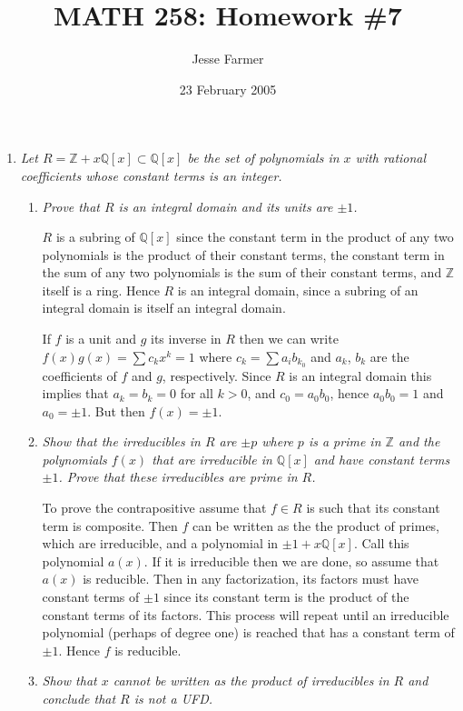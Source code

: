 \documentclass[10pt]{article}
\title{MATH 258: Homework \#7}
\author{Jesse Farmer}
\date{23 February 2005}
\newcommand{\Z}{\mathbb{Z}}
\newcommand{\Q}{\mathbb{Q}}
\begin{document}
\maketitle
\begin{enumerate}

\item \emph{Let $R = \Z + x\Q[x] \subset \Q[x]$ be the set of polynomials in $x$ with rational coefficients whose constant terms is an integer.}
\begin{enumerate}
\item \emph{Prove that $R$ is an integral domain and its units are $\pm 1$.}

$R$ is a subring of $\Q[x]$ since the constant term in the product of any two polynomials is the product of their constant terms, the constant term in the sum of any two polynomials is the sum of their constant terms, and $\Z$ itself is a ring.  Hence $R$ is an integral domain, since a subring of an integral domain is itself an integral domain.

If $f$ is a unit and $g$ its inverse in $R$ then we can write $f(x)g(x) = \sum c_kx^k = 1$ where $c_k = \sum a_ib_{k_0}$ and $a_k$, $b_k$ are the coefficients of $f$ and $g$, respectively.  Since $R$ is an integral domain this implies that $a_k = b_k = 0$ for all $k > 0$, and $c_0 = a_0b_0$, hence $a_0b_0 = 1$ and $a_0 = \pm 1$.  But then $f(x) = \pm 1$.

\item \emph{Show that the irreducibles in $R$ are $\pm p$ where $p$ is a prime in $\Z$ and the polynomials $f(x)$ that are irreducible in $\Q[x]$ and have constant terms $\pm 1$.  Prove that these irreducibles are prime in $R$.}

To prove the contrapositive assume that $f \in R$ is such that its constant term is composite.  Then $f$ can be written as the the product of primes, which are irreducible, and a polynomial in $\pm 1 + x\Q[x]$.  Call this polynomial $a(x)$.  If it is irreducible then we are done, so assume that $a(x)$ is reducible.  Then in any factorization, its factors must have constant terms of $\pm 1$ since its constant term is the product of the constant terms of its factors.  This process will repeat until an irreducible polynomial (perhaps of degree one) is reached that has a constant term of $\pm 1$.  Hence $f$ is reducible.

\item \emph{Show that $x$ cannot be written as the product of irreducibles in $R$ and conclude that $R$ is not a UFD.}


\end{enumerate}
\end{enumerate}
\end{document}

